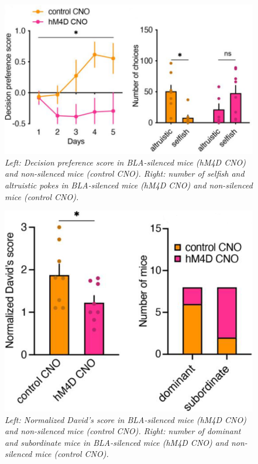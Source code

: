\documentclass[12pt, a4paper]{report}
\begin{document}
\begin{figure}[H]
	\begin{center}
		\includegraphics[scale=0.6]{silencing.png} 
	\end{center} 
	\caption{\textit{Left: Decision preference score in BLA-silenced mice (hM4D CNO) and non-silenced mice (control CNO). Right: number of selfish and altruistic pokes in BLA-silenced mice (hM4D CNO) and non-silenced mice (control CNO). }} \label{silencing}
	
\end{figure}


\begin{figure}[H]
	\begin{center}
		\includegraphics[scale=0.6]{sil_dom.png} 
	\end{center} 
	\caption{\textit{Left: Normalized David's score in BLA-silenced mice (hM4D CNO) and non-silenced mice (control CNO). Right: number of dominant and subordinate mice in BLA-silenced mice (hM4D CNO) and non-silenced mice (control CNO). }} \label{sil_dom}
	
\end{figure}
\end{document}
